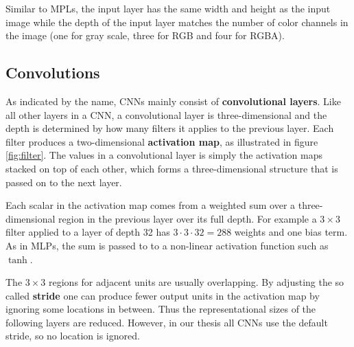 
Similar to MPLs, the input layer has the same width and height as the input image while the depth of the input layer matches the number of color channels in the image (one for gray scale, three for RGB and four for RGBA).


\subsection{Convolutions}



As indicated by the name, CNNs mainly consist of \textbf{convolutional layers}. Like all other layers in a CNN, a convolutional layer is three-dimensional and the depth is determined by how many filters it applies to the previous layer.  Each filter produces a two-dimensional \textbf{activation map}, as illustrated in figure \ref{fig:filter}. The values in a convolutional layer is simply the activation maps stacked on top of each other, which forms a three-dimensional structure that is passed on to the next layer.

Each scalar in the activation map comes from a weighted sum over a three-dimensional region in the previous layer over its full depth. For example a $3 \times 3$ filter applied to a layer of depth 32 has $3 \cdot 3 \cdot 32=288$ weights and one bias term.
As in MLPs, the sum is passed to to a non-linear activation function such as $\tanh$.

The $3 \times 3$ regions for adjacent units are usually overlapping.
By adjusting the so called \textbf{stride} one can produce fewer output units in the activation map by ignoring some locations in between.
Thus the representational sizes of the following layers are reduced.
However, in our thesis all CNNs use the default stride, so no location is ignored.

